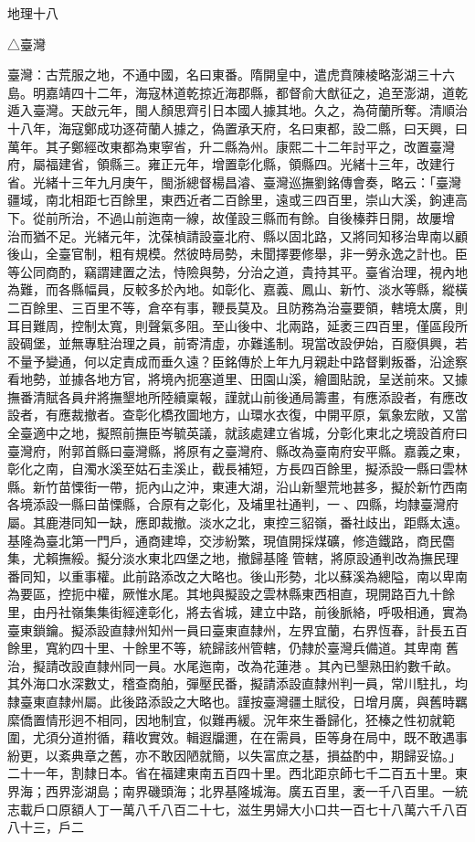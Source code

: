 
\begin{pinyinscope}
地理十八

△臺灣

臺灣：古荒服之地，不通中國，名曰東番。隋開皇中，遣虎賁陳棱略澎湖三十六島。明嘉靖四十二年，海寇林道乾掠近海郡縣，都督俞大猷征之，追至澎湖，道乾遁入臺灣。天啟元年，閩人顏思齊引日本國人據其地。久之，為荷蘭所奪。清順治十八年，海寇鄭成功逐荷蘭人據之，偽置承天府，名曰東都，設二縣，曰天興，曰萬年。其子鄭經改東都為東寧省，升二縣為州。康熙二十二年討平之，改置臺灣府，屬福建省，領縣三。雍正元年，增置彰化縣，領縣四。光緒十三年，改建行省。光緒十三年九月庚午，閩浙總督楊昌濬、臺灣巡撫劉銘傳會奏，略云：「臺灣疆域，南北相距七百餘里，東西近者二百餘里，遠或三四百里，崇山大溪，鉤連高下。從前所治，不過山前迤南一線，故僅設三縣而有餘。自後榛莽日開，故屢增治而猶不足。光緒元年，沈葆楨請設臺北府、縣以固北路，又將同知移治卑南以顧後山，全臺官制，粗有規模。然彼時局勢，未聞擇要修舉，非一勞永逸之計也。臣等公同商酌，竊謂建置之法，恃險與勢，分治之道，貴持其平。臺省治理，視內地為難，而各縣幅員，反較多於內地。如彰化、嘉義、鳳山、新竹、淡水等縣，縱橫二百餘里、三百里不等，倉卒有事，鞭長莫及。且防務為治臺要領，轄境太廣，則耳目難周，控制太寬，則聲氣多阻。至山後中、北兩路，延袤三四百里，僅區段所設碉堡，並無專駐治理之員，前寄清虛，亦難遙制。現當改設伊始，百廢俱興，若不量予變通，何以定責成而垂久遠？臣銘傳於上年九月親赴中路督剿叛番，沿途察看地勢，並據各地方官，將境內扼塞道里、田園山溪，繪圖貼說，呈送前來。又據撫番清賦各員弁將撫墾地所陸續稟報，謹就山前後通局籌畫，有應添設者，有應改設者，有應裁撤者。查彰化橋孜圖地方，山環水衣復，中開平原，氣象宏敞，又當全臺適中之地，擬照前撫臣岑毓英議，就該處建立省城，分彰化東北之境設首府曰臺灣府，附郭首縣曰臺灣縣，將原有之臺灣府、縣改為臺南府安平縣。嘉義之東，彰化之南，自濁水溪至姑石圭溪止，截長補短，方長四百餘里，擬添設一縣曰雲林縣。新竹苗慄街一帶，扼內山之沖，東連大湖，沿山新墾荒地甚多，擬於新竹西南各境添設一縣曰苗慄縣，合原有之彰化，及埔里社通判，一、四縣，均隸臺灣府屬。其鹿港同知一缺，應即裁撤。淡水之北，東控三貂嶺，番社歧出，距縣太遠。基隆為臺北第一門戶，通商建埠，交涉紛繁，現值開採煤礦，修造鐵路，商民麕集，尤賴撫綏。擬分淡水東北四堡之地，撤歸基隆管轄，將原設通判改為撫民理番同知，以重事權。此前路添改之大略也。後山形勢，北以蘇溪為總隘，南以卑南為要區，控扼中權，厥惟水尾。其地與擬設之雲林縣東西相直，現開路百九十餘里，由丹社嶺集集街經達彰化，將去省城，建立中路，前後脈絡，呼吸相通，實為臺東鎖鑰。擬添設直隸州知州一員曰臺東直隸州，左界宜蘭，右界恆春，計長五百餘里，寬約四十里、十餘里不等，統歸該州管轄，仍隸於臺灣兵備道。其卑南舊治，擬請改設直隸州同一員。水尾迤南，改為花蓮港。其內已墾熟田約數千畝。其外海口水深數丈，稽查商舶，彈壓民番，擬請添設直隸州判一員，常川駐扎，均隸臺東直隸州屬。此後路添設之大略也。謹按臺灣疆土賦役，日增月廣，與舊時羈縻僑置情形迥不相同，因地制宜，似難再緩。況年來生番歸化，狉榛之性初就範圍，尤須分道拊循，藉收實效。輯遐牖邇，在在需員，臣等身在局中，既不敢遇事紛更，以紊典章之舊，亦不敢因陋就簡，以失富庶之基，損益酌中，期歸妥協。」二十一年，割隸日本。省在福建東南五百四十里。西北距京師七千二百五十里。東界海；西界澎湖島；南界磯頭海；北界基隆城海。廣五百里，袤一千八百里。一統志載戶口原額人丁一萬八千八百二十七，滋生男婦大小口共一百七十八萬六千八百八十三，戶二
\end{pinyinscope}
